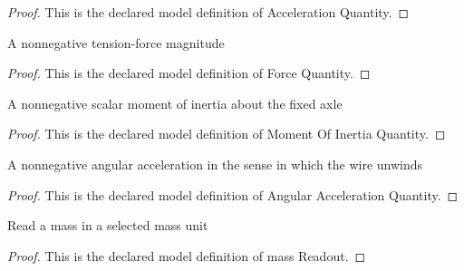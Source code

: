 \begin{proof}
  This is the declared model definition of Acceleration Quantity.
\end{proof}
\begin{definition}
  \label{def:physics:phyx-mini-0771:phyxminiproblems-problemphyxmini0771-forcequantity}
  A nonnegative tension-force magnitude
\end{definition}
\begin{proof}
  This is the declared model definition of Force Quantity.
\end{proof}
\begin{definition}
  \label{def:physics:phyx-mini-0771:phyxminiproblems-problemphyxmini0771-momentofinertiaquantity}
  A nonnegative scalar moment of inertia about the fixed axle
\end{definition}
\begin{proof}
  This is the declared model definition of Moment Of Inertia Quantity.
\end{proof}
\begin{definition}
  \label{def:physics:phyx-mini-0771:phyxminiproblems-problemphyxmini0771-angularaccelerationquantity}
  A nonnegative angular acceleration in the sense in which the wire unwinds
\end{definition}
\begin{proof}
  This is the declared model definition of Angular Acceleration Quantity.
\end{proof}
\begin{definition}
  \label{def:physics:phyx-mini-0771:phyxminiproblems-problemphyxmini0771-massreadout}
  Read a mass in a selected mass unit
\end{definition}
\begin{proof}
  This is the declared model definition of mass Readout.
\end{proof}

